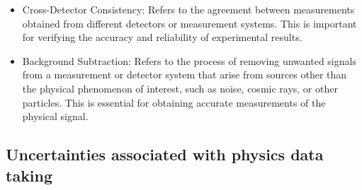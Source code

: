 \begin{itemize}
\item Cross-Detector Consistency: Refers to the agreement between measurements obtained from different detectors or measurement systems. This is important for verifying the accuracy and reliability of experimental results.

\item Background Subtraction: Refers to the process of removing unwanted signals from a measurement or detector system that arise from sources other than the physical phenomenon of interest, such as noise, cosmic rays, or other particles. This is essential for obtaining accurate measurements of the physical signal.

  \end{itemize}

\subsection{Uncertainties associated with physics data taking}

